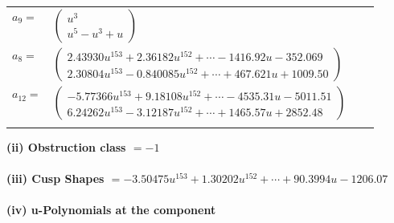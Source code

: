 \documentclass[1p]{elsarticle_modified}
\theoremstyle{definition}
\begin{document}
\begin{tabular}{m{7pt} m{180pt} m{7pt} m{180pt} }
\flushright $a_{9}=$&$\begin{pmatrix}u^3\\u^5- u^3+u\end{pmatrix}$ \\
\flushright $a_{8}=$&$\begin{pmatrix}2.43930 u^{153}+2.36182 u^{152}+\cdots-1416.92 u-352.069\\2.30804 u^{153}-0.840085 u^{152}+\cdots+467.621 u+1009.50\end{pmatrix}$ \\
\flushright $a_{12}=$&$\begin{pmatrix}-5.77366 u^{153}+9.18108 u^{152}+\cdots-4535.31 u-5011.51\\6.24262 u^{153}-3.12187 u^{152}+\cdots+1465.57 u+2852.48\end{pmatrix}$\\&\end{tabular}
\flushleft \textbf{(ii) Obstruction class $= -1$}\\~\\
\flushleft \textbf{(iii) Cusp Shapes $= -3.50475 u^{153}+1.30202 u^{152}+\cdots+90.3994 u-1206.07$}\\~\\
\newpage\renewcommand{\arraystretch}{1}
\flushleft \textbf{(iv) u-Polynomials at the component}\newline \\
\end{document}
